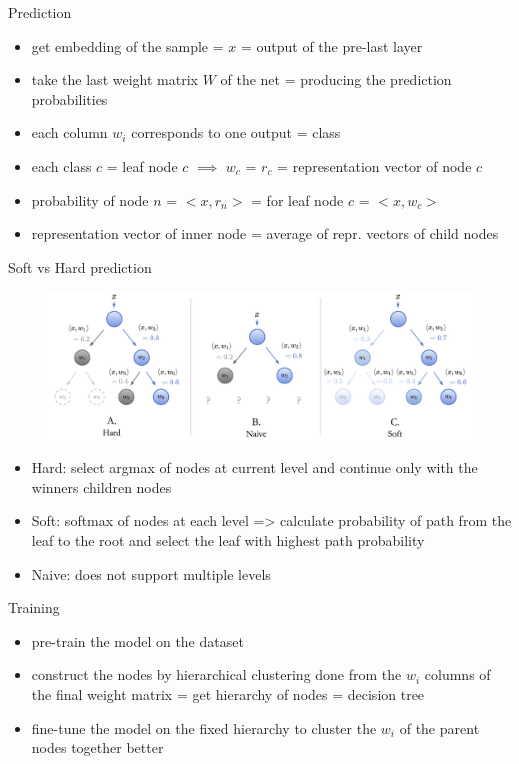 \documentclass{beamer}
\begin{document}
\begin{frame}{Prediction}

\begin{itemize}
\item get embedding of the sample = $x$ = output of the pre-last layer
\item take the last weight matrix $W$ of the net = producing the prediction probabilities
\item each column $w_i$ corresponds to one output = class
\item each class $c$ = leaf node $c$ $\implies$ $w_c$ = $r_c$ = representation vector of node $c$  
\item probability of node $n$ = $<x,r_n>$ = for leaf node $c$ = $<x, w_c>$
\item representation vector of inner node = average of repr. vectors of child nodes
\end{itemize}

\end{frame}
\begin{frame}{Soft vs Hard prediction}

\begin{figure}[h]
\includegraphics[width=\textwidth]{img/hard_soft}
\end{figure}

\begin{itemize}
\item Hard: select argmax of nodes at current level and continue only with the winners children nodes
\item Soft: softmax of nodes at each level => calculate probability of path from the leaf to the root and select the leaf with highest path probability
\item Naive: does not support multiple levels
\end{itemize}

\end{frame}
\begin{frame}{Training}

\begin{itemize}
\item pre-train the model on the dataset
\item construct the nodes by hierarchical clustering done from the $w_i$ columns of the final weight matrix = get hierarchy of nodes = decision tree
\item fine-tune the model on the fixed hierarchy to cluster the $w_i$ of the parent nodes together better
\end{itemize}

\end{frame}
\end{document}
